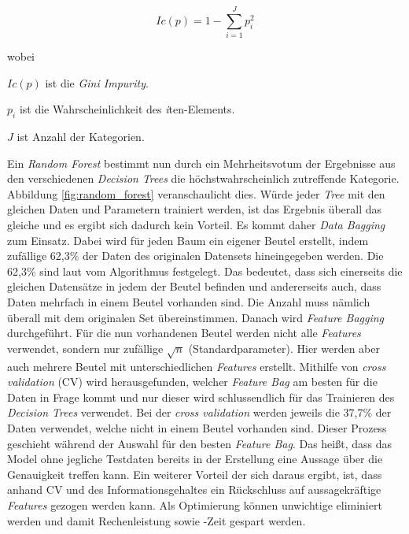 \begin{equation}
	Ic(p) = 1 - \sum \limits_{i=1}^J p_i^2
	\label{formular:gini}
\end{equation}

\noindent
wobei

\noindent
$Ic(p)$ ist die \textit{Gini Impurity}.

\noindent
$p_i$ ist die Wahrscheinlichkeit des \textit{i}ten-Elements.

\noindent
$J$ ist Anzahl der Kategorien.

Ein \textit{Random Forest} bestimmt nun durch ein Mehrheitsvotum der Ergebnisse aus den verschiedenen \textit{Decision Trees} die höchstwahrscheinlich zutreffende Kategorie. Abbildung \ref{fig:random_forest} veranschaulicht dies. Würde jeder \textit{Tree} mit den gleichen Daten und Parametern trainiert werden, ist das Ergebnis überall das gleiche und es ergibt sich dadurch kein Vorteil. Es kommt daher \textit{Data Bagging} zum Einsatz. Dabei wird für jeden Baum ein eigener Beutel erstellt, indem zufällige 62,3\% der Daten des originalen Datensets hineingegeben werden. Die 62,3\% sind laut \cite{Rebala2019} vom Algorithmus festgelegt. Das bedeutet, dass sich einerseits die gleichen Datensätze in jedem der Beutel befinden und andererseits auch, dass Daten mehrfach in einem Beutel vorhanden sind. Die Anzahl muss nämlich überall mit dem originalen Set übereinstimmen. Danach wird \textit{Feature Bagging} durchgeführt. Für die nun vorhandenen Beutel werden nicht alle \textit{Features} verwendet, sondern nur zufällige $\sqrt{n}$ (Standardparameter). Hier werden aber auch mehrere Beutel mit unterschiedlichen \textit{Features} erstellt. Mithilfe von \textit{cross validation} (CV) wird herausgefunden, welcher \textit{Feature Bag} am besten für die Daten in Frage kommt und nur dieser wird schlussendlich für das Trainieren des \textit{Decision Trees} verwendet. Bei der \textit{cross validation} werden jeweils die 37,7\% der Daten verwendet, welche nicht in einem Beutel vorhanden sind. Dieser Prozess geschieht während der Auswahl für den besten \textit{Feature Bag}. Das heißt, dass das Model ohne jegliche Testdaten bereits in der Erstellung eine Aussage über die Genauigkeit treffen kann. Ein weiterer Vorteil der sich daraus ergibt, ist, dass anhand CV und des Informationsgehaltes ein Rückschluss auf aussagekräftige \textit{Features} gezogen werden kann. Als Optimierung können unwichtige eliminiert werden und damit Rechenleistung sowie -Zeit gespart werden.

